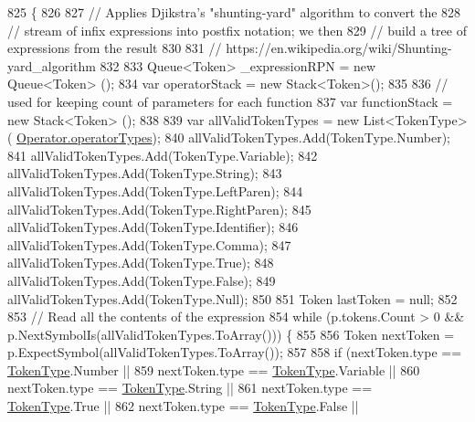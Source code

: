 \begin{DoxyCode}
825                                                                          \{
826 
827                 \textcolor{comment}{// Applies Djikstra's "shunting-yard" algorithm to convert the }
828                 \textcolor{comment}{// stream of infix expressions into postfix notation; we then}
829                 \textcolor{comment}{// build a tree of expressions from the result}
830 
831                 \textcolor{comment}{// https://en.wikipedia.org/wiki/Shunting-yard\_algorithm}
832 
833                 Queue<Token> \_expressionRPN = \textcolor{keyword}{new} Queue<Token> ();
834                 var operatorStack = \textcolor{keyword}{new} Stack<Token>();
835 
836                 \textcolor{comment}{// used for keeping count of parameters for each function}
837                 var functionStack = \textcolor{keyword}{new} Stack<Token> (); 
838 
839                 var allValidTokenTypes = \textcolor{keyword}{new} List<TokenType>(
      \hyperlink{a00117_a8dca7db3b76b8c358aba6068274e07df}{Operator.operatorTypes});
840                 allValidTokenTypes.Add(TokenType.Number);
841                 allValidTokenTypes.Add(TokenType.Variable);
842                 allValidTokenTypes.Add(TokenType.String);
843                 allValidTokenTypes.Add(TokenType.LeftParen);
844                 allValidTokenTypes.Add(TokenType.RightParen);
845                 allValidTokenTypes.Add(TokenType.Identifier);
846                 allValidTokenTypes.Add(TokenType.Comma);
847                 allValidTokenTypes.Add(TokenType.True);
848                 allValidTokenTypes.Add(TokenType.False);
849                 allValidTokenTypes.Add(TokenType.Null);
850 
851                 Token lastToken = null;
852 
853                 \textcolor{comment}{// Read all the contents of the expression}
854                 \textcolor{keywordflow}{while} (p.tokens.Count > 0 && p.NextSymbolIs(allValidTokenTypes.ToArray())) \{
855 
856                     Token nextToken = p.ExpectSymbol(allValidTokenTypes.ToArray());
857 
858                     \textcolor{keywordflow}{if} (nextToken.type == \hyperlink{a00031_a301aa7c866593a5b625a8fc158bbeace}{TokenType}.Number ||
859                         nextToken.type == \hyperlink{a00031_a301aa7c866593a5b625a8fc158bbeace}{TokenType}.Variable ||
860                         nextToken.type == \hyperlink{a00031_a301aa7c866593a5b625a8fc158bbeace}{TokenType}.String ||
861                         nextToken.type == \hyperlink{a00031_a301aa7c866593a5b625a8fc158bbeace}{TokenType}.True ||
862                         nextToken.type == \hyperlink{a00031_a301aa7c866593a5b625a8fc158bbeace}{TokenType}.False ||

\end{DoxyCode}
